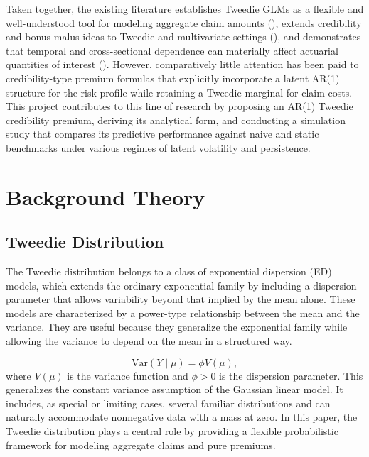 \documentclass{sfuthesis}
\numberwithin{equation}{chapter}
\begin{document}
Taken together, the existing literature establishes Tweedie GLMs as a flexible and well-understood tool for modeling aggregate claim amounts (\cite{jorgensen1994fitting,smyth2002fitting,klugman2019}), extends credibility and bonus-malus ideas to Tweedie and multivariate settings (\cite{ohlsson2006exact,frangos2001design,jeong2024tweedie}), and demonstrates that temporal and cross-sectional dependence can materially affect actuarial quantities of interest (\cite{jeong2020predictive,youn2023simple,peng2016multilevel,shi2016insurance}). However, comparatively little attention has been paid to credibility-type premium formulas that explicitly incorporate a latent AR(1) structure for the risk profile while retaining a Tweedie marginal for claim costs. This project contributes to this line of research by proposing an AR(1) Tweedie credibility premium, deriving its analytical form, and conducting a simulation study that compares its predictive performance against naive and static benchmarks under various regimes of latent volatility and persistence.

\section{Background Theory}
\subsection{Tweedie Distribution}

The Tweedie distribution belongs to a class of exponential dispersion (ED) models, which extends the ordinary exponential family by including a dispersion parameter that allows variability beyond that implied by the mean alone. These models are  characterized by a power-type relationship between the mean and the variance. They are useful because they generalize the exponential family while allowing the variance to depend on the mean in a structured way.

\begin{equation}
    \mathrm{Var}(Y \mid \mu) = \phi V(\mu),
    \label{eq:edm_variance}
\end{equation}
where $V(\mu)$ is the variance function and $\phi > 0$ is the dispersion parameter. This generalizes the constant variance assumption of the Gaussian linear model. It includes, as special or limiting cases, several familiar distributions and can naturally accommodate nonnegative data with a mass at zero. In this paper, the Tweedie distribution plays a central role by providing a flexible probabilistic framework for modeling aggregate claims and pure premiums.
\end{document}
